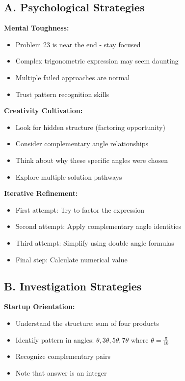 \documentclass[12pt]{article}
\begin{document}
\begin{strategicbox}

\subsection*{A. Psychological Strategies}

\textbf{Mental Toughness:}
\begin{itemize}
    \item Problem 23 is near the end - stay focused
    \item Complex trigonometric expression may seem daunting
    \item Multiple failed approaches are normal
    \item Trust pattern recognition skills
\end{itemize}

\textbf{Creativity Cultivation:}
\begin{itemize}
    \item Look for hidden structure (factoring opportunity)
    \item Consider complementary angle relationships
    \item Think about why these specific angles were chosen
    \item Explore multiple solution pathways
\end{itemize}

\textbf{Iterative Refinement:}
\begin{itemize}
    \item First attempt: Try to factor the expression
    \item Second attempt: Apply complementary angle identities
    \item Third attempt: Simplify using double angle formulas
    \item Final step: Calculate numerical value
\end{itemize}

\subsection*{B. Investigation Strategies}

\textbf{Startup Orientation:}
\begin{itemize}
    \item Understand the structure: sum of four products
    \item Identify pattern in angles: $\theta, 3\theta, 5\theta, 7\theta$ where $\theta = \frac{\pi}{16}$
    \item Recognize complementary pairs
    \item Note that answer is an integer
\end{itemize}


\end{strategicbox}
\end{document}
